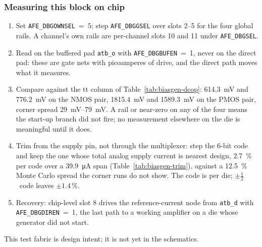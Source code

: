%

\subsubsection{Measuring this block on chip}

\begin{enumerate}[nosep]
\item Set \texttt{AFE\_DBGOWNSEL}~=~5; step \texttt{AFE\_DBGGSEL} over slots
  2--5 for the four global rails. A channel's own rails are per-channel slots
  10 and 11 under \texttt{AFE\_DBGSEL}.
\item Read on the buffered pad \texttt{atb\_o} with
  \texttt{AFE\_DBGBUFEN}~=~1, never on the direct pad: these are gate nets
  with picoamperes of drive, and the direct path moves what it measures.
\item Compare against the tt column of Table~\ref{tab:biasgen-dcop}:
  \SI{614.3}{\milli\volt} and \SI{776.2}{\milli\volt} on the NMOS pair,
  \SI{1815.4}{\milli\volt} and \SI{1589.3}{\milli\volt} on the PMOS pair,
  corner spread \SIrange{29}{79}{\milli\volt}. A rail or near-zero on any of
  the four means the start-up branch did not fire; no measurement elsewhere on
  the die is meaningful until it does.
\item Trim from the supply pin, not through the multiplexer: step the 6-bit
  code and keep the one whose total analog supply current is nearest design,
  \SI{2.7}{\percent} per code over a \SI{39.9}{\micro\ampere} span
  (Table~\ref{tab:biasgen-trim}), against a \SI{12.5}{\percent} Monte Carlo
  spread the corner runs do not show. The code is per die;
  \(\pm\tfrac{1}{2}\)~code leaves \(\pm1.4\,\%\).
\item Recovery: chip-level slot 8 drives the reference-current node from
  \texttt{atb\_d} with \texttt{AFE\_DBGDIREN}~=~1, the last path to a
  working amplifier on a die whose generator did not start.
\end{enumerate}
This test fabric is design intent; it is not yet in the schematics.
